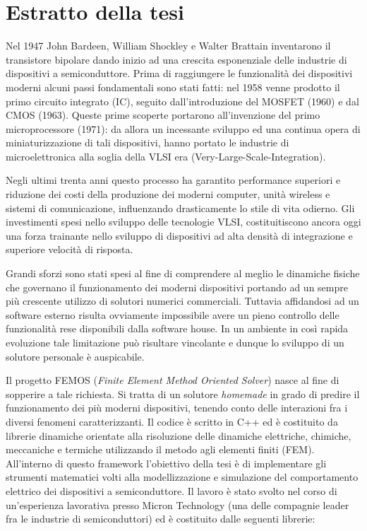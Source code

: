 \chapter*{Estratto della tesi}

Nel 1947 John Bardeen, William Shockley e Walter Brattain inventarono il transistore bipolare dando inizio ad una crescita esponenziale delle industrie di dispositivi a semiconduttore. Prima di raggiungere le funzionalit\`a dei dispositivi moderni alcuni passi fondamentali sono stati fatti: nel 1958 venne prodotto il primo circuito integrato (IC), seguito dall'introduzione del MOSFET (1960) e dal CMOS (1963). Queste prime scoperte portarono all'invenzione del primo microprocessore (1971): da allora un incessante sviluppo ed una continua opera di miniaturizzazione di tali dispositivi, hanno portato le industrie di microelettronica alla soglia della VLSI era (Very-Large-Scale-Integration). 

Negli ultimi trenta anni questo processo ha garantito performance superiori e riduzione dei costi della produzione dei moderni computer, unit\`a wireless e sistemi di comunicazione, influenzando drasticamente lo stile di vita odierno.
Gli investimenti spesi nello sviluppo delle tecnologie VLSI, costituitiscono ancora oggi una forza trainante nello sviluppo di dispositivi ad alta densit\`a di integrazione e superiore velocit\`a di risposta.

Grandi sforzi sono stati spesi al fine di comprendere al meglio le dinamiche fisiche che governano il funzionamento dei moderni dispositivi portando ad un sempre pi\`u crescente utilizzo di solutori numerici commerciali.
Tuttavia affidandosi ad un software esterno risulta ovviamente impossibile avere un pieno controllo delle funzionalit\`a rese disponibili dalla software house. In un ambiente in cos\`i rapida evoluzione tale limitazione pu\`o risultare vincolante e dunque lo sviluppo di un solutore personale \`e auspicabile.

Il progetto FEMOS (\textit{Finite Element Method Oriented Solver}) nasce al fine di sopperire a tale richiesta. Si tratta di un solutore \textit{homemade} in grado di predire il funzionamento dei pi\`u moderni dispositivi, tenendo conto delle interazioni fra i diversi fenomeni caratterizzanti. Il codice \`e scritto in C++ ed \`e costituito da librerie dinamiche orientate alla risoluzione delle dinamiche elettriche, chimiche, meccaniche e termiche utilizzando il metodo agli elementi finiti (FEM). All'interno di questo framework l'obiettivo della tesi \`e di implementare gli strumenti matematici volti alla modellizzazione e simulazione del comportamento elettrico dei dispositivi a semiconduttore. Il lavoro \`e stato svolto nel corso di un'esperienza lavorativa presso Micron Technology (una delle compagnie leader fra le industrie di semiconduttori) ed \`e costituito dalle seguenti librerie:

